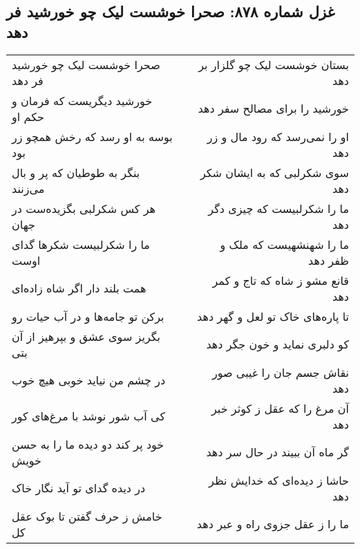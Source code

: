 \begin{center}
\section*{غزل شماره ۸۷۸: صحرا خوشست لیک چو خورشید فر دهد}
\label{sec:0878}
\begin{longtable}{l p{0.5cm} r}
صحرا خوشست لیک چو خورشید فر دهد
&&
بستان خوشست لیک چو گلزار بر دهد
\\
خورشید دیگریست که فرمان و حکم او
&&
خورشید را برای مصالح سفر دهد
\\
بوسه به او رسد که رخش همچو زر بود
&&
او را نمی‌رسد که رود مال و زر دهد
\\
بنگر به طوطیان که پر و بال می‌زنند
&&
سوی شکرلبی که به ایشان شکر دهد
\\
هر کس شکرلبی بگزیده‌ست در جهان
&&
ما را شکرلبیست که چیزی دگر دهد
\\
ما را شکرلبیست شکرها گدای اوست
&&
ما را شهنشهیست که ملک و ظفر دهد
\\
همت بلند دار اگر شاه زاده‌ای
&&
قانع مشو ز شاه که تاج و کمر دهد
\\
برکن تو جامه‌ها و در آب حیات رو
&&
تا پاره‌های خاک تو لعل و گهر دهد
\\
بگریز سوی عشق و بپرهیز از آن بتی
&&
کو دلبری نماید و خون جگر دهد
\\
در چشم من نیاید خوبی هیچ خوب
&&
نقاش جسم جان را غیبی صور دهد
\\
کی آب شور نوشد با مرغ‌های کور
&&
آن مرغ را که عقل ز کوثر خبر دهد
\\
خود پر کند دو دیده ما را به حسن خویش
&&
گر ماه آن ببیند در حال سر دهد
\\
در دیده گدای تو آید نگار خاک
&&
حاشا ز دیده‌ای که خدایش نظر دهد
\\
خامش ز حرف گفتن تا بوک عقل کل
&&
ما را ز عقل جزوی راه و عبر دهد
\\
\end{longtable}
\end{center}
